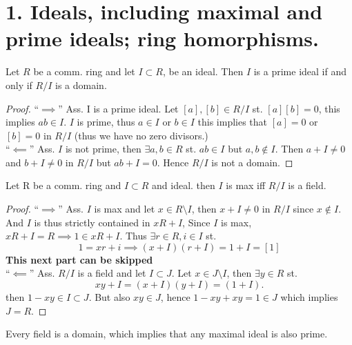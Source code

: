 \chapter*{1. Ideals, including maximal and prime ideals; ring homorphisms.}
\begin{proposition}
  Let $R$ be a comm. ring and let $I \subset R$, be an ideal. Then $I$ is a prime ideal if and only if $R/I$ is a domain.
\end{proposition}

\begin{proof}
  ``$\implies$'' Ass. I is a prime ideal. Let $[a],[b] \in R/I$ st. $[a][b] = 0$, this implies $ab \in I$. $I$ is prime, thus $a \in I$ or $b \in I$ this implies that $[a] = 0$ or $[b] = 0$ in $R/I$ (thus we have no zero divisors.) \\
  ``$\impliedby$'' Ass. $I$ is not prime, then $\exists a, b \in R$ st. $ab \in I$ but $a, b \not \in I$. Then $a + I \neq 0$ and $b + I \neq 0$  in $R/I$ but $ab + I = 0$. Hence $R/I$ is not a domain.
\end{proof}

\begin{proposition}
  Let R be a comm. ring and $I \subset R$ and ideal. then $I$ is max iff $R/I$ is a field.
\end{proposition}

\begin{proof}
  ``$\implies$'' Ass. $I$ is max and let $x \in R \setminus I$, then $x + I \neq 0$ in $R/I$ since $x \not \in I$. And $I$ is thus strictly contained in $xR + I$, Since $I$ is max, $xR + I = R \implies 1 \in xR + I$. Thus $\exists r \in R, i \in I$ st.
  \begin{equation*}
    1 = xr + i \implies (x + I)(r + I) = 1 + I = [1]
  \end{equation*}
  \textbf{This next part can be skipped} \\
  ``$\impliedby$'' Ass. $R/I$ is a field and let $I \subset J$. Let $x \in J \setminus I$, then $\exists y \in R$ st.
  \begin{equation*}
    xy + I = (x + I)(y + I) = (1 + I).
  \end{equation*}
  then $1 - xy \in I \subset J$. But also $xy \in J$, hence $1 - xy + xy = 1 \in J$ which implies $J = R$.
\end{proof}

\begin{remark}
  Every field is a domain, which implies that any maximal ideal is also prime.
\end{remark}
